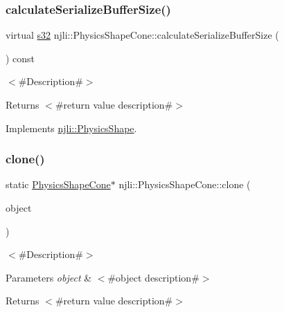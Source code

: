 \subsubsection{\texorpdfstring{calculate\+Serialize\+Buffer\+Size()}{calculateSerializeBufferSize()}}
{\footnotesize\ttfamily virtual \mbox{\hyperlink{_util_8h_aa62c75d314a0d1f37f79c4b73b2292e2}{s32}} njli\+::\+Physics\+Shape\+Cone\+::calculate\+Serialize\+Buffer\+Size (\begin{DoxyParamCaption}{ }\end{DoxyParamCaption}) const\hspace{0.3cm}{\ttfamily [virtual]}}

$<$\#\+Description\#$>$

\begin{DoxyReturn}{Returns}
$<$\#return value description\#$>$ 
\end{DoxyReturn}


Implements \mbox{\hyperlink{classnjli_1_1_physics_shape_a0612a1c8c3f4520d78cb7f5838f03074}{njli\+::\+Physics\+Shape}}.

\mbox{\label{classnjli_1_1_physics_shape_cone_aa62661a9209d65ef178185bf87aa1285}} 
\subsubsection{\texorpdfstring{clone()}{clone()}}
{\footnotesize\ttfamily static \mbox{\hyperlink{classnjli_1_1_physics_shape_cone}{Physics\+Shape\+Cone}}$\ast$ njli\+::\+Physics\+Shape\+Cone\+::clone (\begin{DoxyParamCaption}\item[{const \mbox{\hyperlink{classnjli_1_1_physics_shape_cone}{Physics\+Shape\+Cone}} \&}]{object }\end{DoxyParamCaption})\hspace{0.3cm}{\ttfamily [static]}}

$<$\#\+Description\#$>$


\begin{DoxyParams}{Parameters}
{\em object} & $<$\#object description\#$>$\\
\hline
\end{DoxyParams}
\begin{DoxyReturn}{Returns}
$<$\#return value description\#$>$ 
\end{DoxyReturn}
\mbox{\label{classnjli_1_1_physics_shape_cone_aa32dff9bc067849302595ced93cadf39}} 

